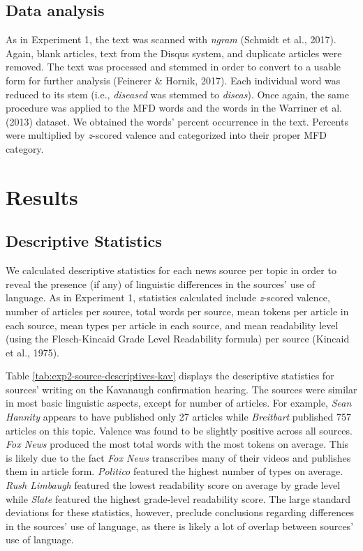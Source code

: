\documentclass[
  english,
  man,floatsintext]{apa6}
\begin{document}
\hypertarget{data-analysis-1}{%
\subsection{Data analysis}\label{data-analysis-1}}

As in Experiment 1, the text was scanned with \emph{ngram} (Schmidt et al., 2017). Again, blank articles, text from the Disqus system, and duplicate articles were removed. The text was processed and stemmed in order to convert to a usable form for further analysis (Feinerer \& Hornik, 2017). Each individual word was reduced to its stem (i.e., \emph{diseased} was stemmed to \emph{diseas}). Once again, the same procedure was applied to the MFD words and the words in the Warriner et al. (2013) dataset. We obtained the words' percent occurrence in the text. Percents were multiplied by \emph{z}-scored valence and categorized into their proper MFD category.

\hypertarget{results-1}{%
\section{Results}\label{results-1}}

\hypertarget{descriptive-statistics-1}{%
\subsection{Descriptive Statistics}\label{descriptive-statistics-1}}

We calculated descriptive statistics for each news source per topic in order to reveal the presence (if any) of linguistic differences in the sources' use of language. As in Experiment 1, statistics calculated include \emph{z}-scored valence, number of articles per source, total words per source, mean tokens per article in each source, mean types per article in each source, and mean readability level (using the Flesch-Kincaid Grade Level Readability formula) per source (Kincaid et al., 1975).

Table \ref{tab:exp2-source-descriptives-kav} displays the descriptive statistics for sources' writing on the Kavanaugh confirmation hearing. The sources were similar in most basic linguistic aspects, except for number of articles. For example, \emph{Sean Hannity} appears to have published only 27 articles while \emph{Breitbart} published 757 articles on this topic. Valence was found to be slightly positive across all sources. \emph{Fox News} produced the most total words with the most tokens on average. This is likely due to the fact \emph{Fox News} transcribes many of their videos and publishes them in article form. \emph{Politico} featured the highest number of types on average. \emph{Rush Limbaugh} featured the lowest readability score on average by grade level while \emph{Slate} featured the highest grade-level readability score. The large standard deviations for these statistics, however, preclude conclusions regarding differences in the sources' use of language, as there is likely a lot of overlap between sources' use of language.
\end{document}

